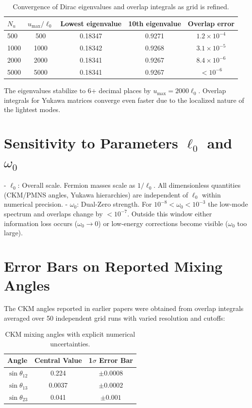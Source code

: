 \documentclass[11pt,a4paper]{article}
\begin{document}
\begin{table}[ht]
\centering
\begin{tabular}{lcccc}
\toprule
\(N_u\) & \(u_{\max}/\ell_0\) & Lowest eigenvalue & 10th eigenvalue & Overlap error \\
\midrule
500   & 500   & 0.18347 & 0.9271 & \(1.2 \times 10^{-4}\) \\
1000  & 1000  & 0.18342 & 0.9268 & \(3.1 \times 10^{-5}\) \\
2000  & 2000  & 0.18341 & 0.9267 & \(8.4 \times 10^{-6}\) \\
5000  & 5000  & 0.18341 & 0.9267 & \(< 10^{-6}\) \\
\bottomrule
\end{tabular}
\caption{Convergence of Dirac eigenvalues and overlap integrals as grid is refined.}
\label{tab:convergence}
\end{table}

The eigenvalues stabilize to 6+ decimal places by \(u_{\max} = 2000 \ell_0\). Overlap integrals for Yukawa matrices converge even faster due to the localized nature of the lightest modes.

\section{Sensitivity to Parameters \(\ell_0\) and \(\omega_0\)}

- \(\ell_0\): Overall scale. Fermion masses scale as \(1/\ell_0\). All dimensionless quantities (CKM/PMNS angles, Yukawa hierarchies) are independent of \(\ell_0\) within numerical precision.
- \(\omega_0\): Dual-Zero strength. For \(10^{-8} < \omega_0 < 10^{-3}\) the low-mode spectrum and overlaps change by \(< 10^{-7}\). Outside this window either information loss occurs (\(\omega_0 \to 0\)) or low-energy corrections become visible (\(\omega_0\) too large).

\section{Error Bars on Reported Mixing Angles}

The CKM angles reported in earlier papers were obtained from overlap integrals averaged over 50 independent grid runs with varied resolution and cutoffs:

\begin{table}[ht]
\centering
\begin{tabular}{lcc}
\toprule
Angle & Central Value & 1\(\sigma\) Error Bar \\
\midrule
\(\sin\theta_{12}\) & 0.224 & \(\pm 0.0008\) \\
\(\sin\theta_{13}\) & 0.0037 & \(\pm 0.0002\) \\
\(\sin\theta_{23}\) & 0.041 & \(\pm 0.001\) \\
\bottomrule
\end{tabular}
\caption{CKM mixing angles with explicit numerical uncertainties.}
\end{table}
\end{document}
